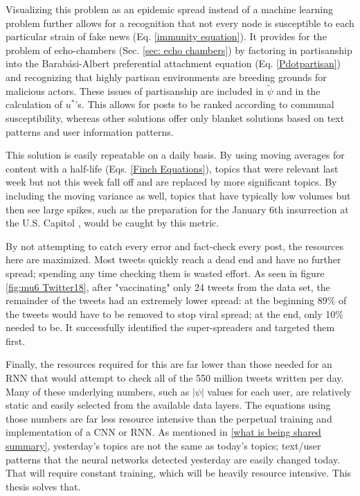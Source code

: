 \documentclass[preprint,review,12pt]{elsarticle}
\begin{document}
Visualizing this problem as an epidemic spread instead of a machine learning problem further allows for a recognition that not every node is susceptible to each particular strain of fake news (Eq. \ref{immunity equation}). It provides for the problem of echo-chambers (Sec. \ref{sec: echo chambers}) by factoring in partisanship into the Barab{\'a}si-Albert preferential attachment equation (Eq. \ref{Pdotpartisan}) and recognizing that highly partisan environments are breeding grounds for malicious actors. These issues of partisanship are included in $\tilde{\psi}$ and in the calculation of $u^*$'s. This allows for posts to be ranked according to communal susceptibility, whereas other solutions offer only blanket solutions based on text patterns and user information patterns. 

This solution is easily repeatable on a daily basis. By using moving averages for content with a half-life (Eqs. \ref{Finch Equations}), topics that were relevant last week but not this week fall off and are replaced by more significant topics. By including the moving variance as well, topics that have typically low volumes but then see large spikes, such as the preparation for the January 6th insurrection at the U.S. Capitol \cite{Levenson2021capitol}, would be caught by this metric. 

By not attempting to catch every error and fact-check every post, the resources here are maximized. Most tweets quickly reach a dead end and have no further spread; spending any time checking them is wasted effort. As seen in figure \ref{fig:mu6 Twitter18}, after "vaccinating" only 24 tweets from the data set, the remainder of the tweets had an extremely lower spread: at the beginning 89\% of the tweets would have to be removed to stop viral spread; at the end, only 10\% needed to be. It successfully identified the super-spreaders and targeted them first.

Finally, the resources required for this are far lower than those needed for an RNN that would attempt to check all of the 550 million tweets written per day. Many of these underlying numbers, such as $|\psi|$ values for each user, are relatively static and easily selected from the available data layers. The equations using those numbers are far less resource intensive than the perpetual training and implementation of a CNN or RNN. As mentioned in \ref{what is being shared summary}, yesterday's topics are not the same as today's topics; text/user patterns that the neural networks detected yesterday are easily changed today. That will require constant training, which will be heavily resource intensive. This thesis solves that.
\end{document}
